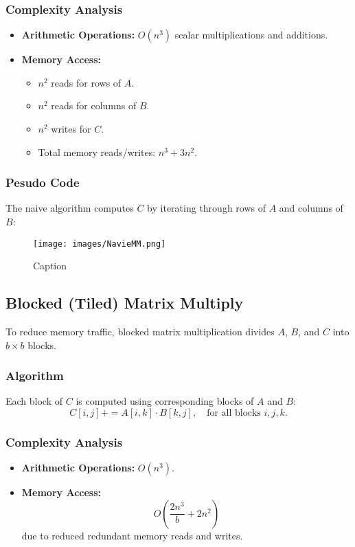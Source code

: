 \documentclass[12pt,a4paper]{article}
\begin{document}
\subsubsection{Complexity Analysis}
\begin{itemize}
    \item \textbf{Arithmetic Operations:} $O(n^3)$ scalar multiplications and additions.
    \item \textbf{Memory Access:} 
    \begin{itemize}
        \item $n^2$ reads for rows of $A$.
        \item $n^2$ reads for columns of $B$.
        \item $n^2$ writes for $C$.
        \item Total memory reads/writes: $n^3 + 3n^2$.
    \end{itemize}
\end{itemize}

\subsubsection{Pesudo Code}
The naive algorithm computes $C$ by iterating through rows of $A$ and columns of $B$:
\begin{figure}[h!]
    \centering
    \texttt{[image: images/NavieMM.png]}
    \caption{Caption}
    \label{fig:enter-label}
\end{figure}

\subsection{Blocked (Tiled) Matrix Multiply}
To reduce memory traffic, blocked matrix multiplication divides $A$, $B$, and $C$ into $b \times b$ blocks.

\subsubsection{Algorithm}
Each block of $C$ is computed using corresponding blocks of $A$ and $B$:
\[
C[i,j] += A[i,k] \cdot B[k,j], \quad \text{for all blocks } i,j,k.
\]

\subsubsection{Complexity Analysis}
\begin{itemize}
    \item \textbf{Arithmetic Operations:} $O(n^3)$.
    \item \textbf{Memory Access:} 
    \[
    O\left( \frac{2n^3}{b} + 2n^2 \right)
    \]
    due to reduced redundant memory reads and writes.
\end{itemize}
\end{document}
